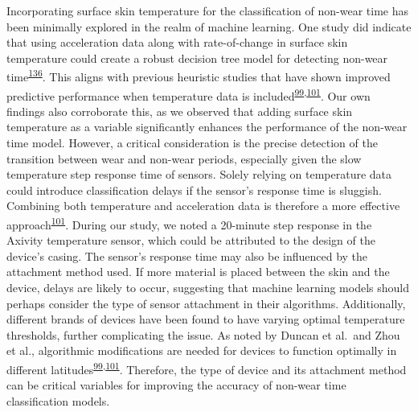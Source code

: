 \documentclass[
  10pt,
]{scrbook}
\begin{document}
Incorporating surface skin temperature for the classification of
non-wear time has been minimally explored in the realm of machine
learning. One study did indicate that using acceleration data along with
rate-of-change in surface skin temperature could create a robust
decision tree model for detecting non-wear
time\textsuperscript{\protect\hyperlink{ref-vert_detecting_2022}{136}}.
This aligns with previous heuristic studies that have shown improved
predictive performance when temperature data is
included\textsuperscript{\protect\hyperlink{ref-duncan_wear-time_2018}{99},\protect\hyperlink{ref-zhou_classification_2015}{101}}.
Our own findings also corroborate this, as we observed that adding
surface skin temperature as a variable significantly enhances the
performance of the non-wear time model. However, a critical
consideration is the precise detection of the transition between wear
and non-wear periods, especially given the slow temperature step
response time of sensors. Solely relying on temperature data could
introduce classification delays if the sensor's response time is
sluggish. Combining both temperature and acceleration data is therefore
a more effective
approach\textsuperscript{\protect\hyperlink{ref-zhou_classification_2015}{101}}.
During our study, we noted a 20-minute step response in the Axivity
temperature sensor, which could be attributed to the design of the
device's casing. The sensor's response time may also be influenced by
the attachment method used. If more material is placed between the skin
and the device, delays are likely to occur, suggesting that machine
learning models should perhaps consider the type of sensor attachment in
their algorithms. Additionally, different brands of devices have been
found to have varying optimal temperature thresholds, further
complicating the issue. As noted by Duncan et al.~and Zhou et al.,
algorithmic modifications are needed for devices to function optimally
in different
latitudes\textsuperscript{\protect\hyperlink{ref-duncan_wear-time_2018}{99},\protect\hyperlink{ref-zhou_classification_2015}{101}}.
Therefore, the type of device and its attachment method can be critical
variables for improving the accuracy of non-wear time classification
models.
\end{document}
